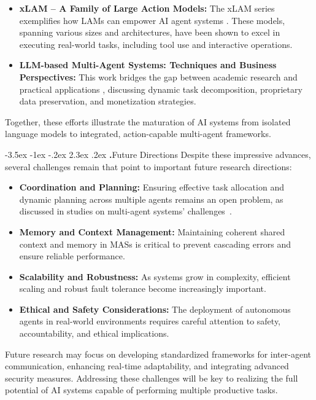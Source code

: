 \documentclass[journal,twoside,10pt]{IEEEtran}
\makeatletter
\renewcommand\section{\@startsection{section}{1}{\z@}%
                       {-3.5ex \@plus -1ex \@minus -.2ex}%
                       {2.3ex \@plus.2ex}%
                       {\normalfont\Large\bfseries\Roman{section}.\quad}}
\makeatother
\begin{document}
\begin{itemize}
    \item \textbf{xLAM – A Family of Large Action Models:} The xLAM series exemplifies how LAMs can empower AI agent systems \cite{zhang2024xlam}. These models, spanning various sizes and architectures, have been shown to excel in executing real-world tasks, including tool use and interactive operations.
    \item \textbf{LLM-based Multi-Agent Systems: Techniques and Business Perspectives:} This work bridges the gap between academic research and practical applications \cite{yang2024llmbased}, discussing dynamic task decomposition, proprietary data preservation, and monetization strategies.
\end{itemize}

Together, these efforts illustrate the maturation of AI systems from isolated language models to integrated, action-capable multi-agent frameworks.

\section{Future Directions}
Despite these impressive advances, several challenges remain that point to important future research directions:

\begin{itemize}
    \item \textbf{Coordination and Planning:} Ensuring effective task allocation and dynamic planning across multiple agents remains an open problem, as discussed in studies on multi-agent systems' challenges~\cite{han2024llm}.
    \item \textbf{Memory and Context Management:} Maintaining coherent shared context and memory in MASs is critical to prevent cascading errors and ensure reliable performance.
    \item \textbf{Scalability and Robustness:} As systems grow in complexity, efficient scaling and robust fault tolerance become increasingly important.
    \item \textbf{Ethical and Safety Considerations:} The deployment of autonomous agents in real-world environments requires careful attention to safety, accountability, and ethical implications.
\end{itemize}

Future research may focus on developing standardized frameworks for inter-agent communication, enhancing real-time adaptability, and integrating advanced security measures. Addressing these challenges will be key to realizing the full potential of AI systems capable of performing multiple productive tasks.
\end{document}
